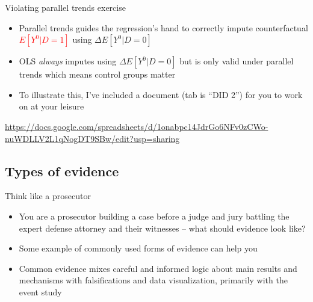 \documentclass{beamer}
\begin{document}
\begin{frame}{Violating parallel trends exercise}

\begin{itemize}
\item Parallel trends guides the regression's hand to correctly impute counterfactual \textcolor{red}{$E[Y^0|D=1]$} using $\Delta E[Y^0|D=0]$ 
\item OLS \emph{always} imputes using $\Delta E[Y^0|D=0]$ but is only valid under parallel trends which means control groups matter
\item To illustrate this, I've included a document (tab is ``DID 2'') for you to work on at your leisure
\end{itemize}

\url{https://docs.google.com/spreadsheets/d/1onabpc14JdrGo6NFv0zCWo-nuWDLLV2L1qNogDT9SBw/edit?usp=sharing}

\end{frame}






\subsection{Types of evidence}

\begin{frame}{Think like a prosecutor}

\begin{itemize}
\item You are a prosecutor building a case before a judge and jury battling the expert defense attorney and their witnesses -- what should evidence look like?
\item Some example of commonly used forms of evidence can help you
\item Common evidence mixes careful and informed logic about main results and mechanisms with falsifications and data visualization, primarily with the event study
\end{itemize}

\end{frame}
\end{document}
